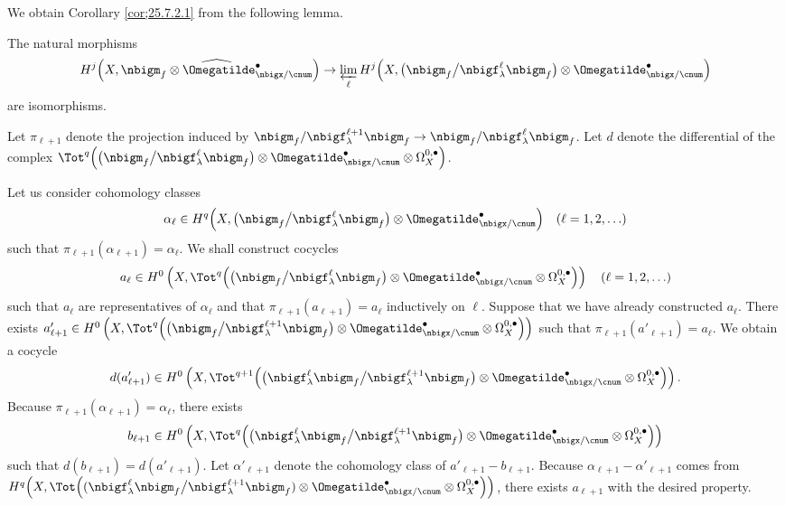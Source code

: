 \documentclass[a4,10pt]{article}
\begin{document}
\vspace{.1in}
We obtain Corollary \ref{cor;25.7.2.1}
from the following lemma.
\begin{lem}
The natural morphisms
\[
 H^j\Bigl(X, \widehat{
 \nbigm_f\otimes\Omegatilde^{\bullet}_{\nbigx/\cnum}}
  \Bigr)
 \to
  \varprojlim_{\ell}
 H^j\Bigl(
 X,
\bigl(
 \nbigm_f\big/
 \nbigf^{\ell}_{\lambda}\nbigm_f
 \bigr)
 \otimes\Omegatilde^{\bullet}_{\nbigx/\cnum}
 \Bigr)
\]
are isomorphisms.
\end{lem}
\pf
Let $\pi_{\ell+1}$ denote the projection
induced by
$\nbigm_f/\nbigf_{\lambda}^{\ell+1}\nbigm_f
\to
\nbigm_f/\nbigf_{\lambda}^{\ell}\nbigm_f$.
Let $d$ denote the differential of the complex
$\Tot^q\Bigl(
\bigl(
\nbigm_f
\big/
\nbigf^{\ell}_{\lambda}\nbigm_f
\bigr)
\otimes\Omegatilde^{\bullet}_{\nbigx/\cnum}
\otimes\Omega^{0,\bullet}_X
\Bigr)$.

Let us consider cohomology classes
\[
\alpha_{\ell}\in
 H^q\Bigl(
 X,
\bigl(
\nbigm_f\big/
\nbigf^{\ell}_{\lambda}\nbigm_f
\bigr)
\otimes\Omegatilde^{\bullet}_{\nbigx/\cnum}
\Bigr)
\quad
(\ell=1,2,\ldots)
\]
such that 
$\pi_{\ell+1}(\alpha_{\ell+1})=\alpha_{\ell}$.
We shall construct cocycles
\[
a_{\ell}
\in 
  H^0\left(
  X,
\Tot^q\Bigl(
\bigl(
\nbigm_f
\big/
\nbigf^{\ell}_{\lambda}\nbigm_f
\bigr)
\otimes\Omegatilde^{\bullet}_{\nbigx/\cnum}
\otimes\Omega^{0,\bullet}_X
\Bigr)
\right)
\quad
(\ell=1,2,\ldots)
\]
such that
$a_{\ell}$ are representatives of $\alpha_{\ell}$
and that $\pi_{\ell+1}(a_{\ell+1})=a_{\ell}$
inductively on $\ell$.
Suppose that we have already constructed $a_{\ell}$.
There exists 
$a'_{\ell+1}
 \in
  H^0\left(
  X,
\Tot^q\Bigl(
\bigl(
\nbigm_f\big/
\nbigf^{\ell+1}_{\lambda}\nbigm_f
\bigr)
\otimes\Omegatilde^{\bullet}_{\nbigx/\cnum}
\otimes\Omega^{0,\bullet}_X
\Bigr)
\right)$
such that
$\pi_{\ell+1}(a'_{\ell+1})=a_{\ell}$.
We obtain a cocycle
\[
 d(a'_{\ell+1})
\in
H^0\left(
X,
\Tot^{q+1}\Bigl(
\bigl(
\nbigf^{\ell}_{\lambda}\nbigm_f
\big/
\nbigf^{\ell+1}_{\lambda}\nbigm_f
\bigr)
\otimes\Omegatilde^{\bullet}_{\nbigx/\cnum}
\otimes\Omega^{0,\bullet}_X
\Bigr)
\right).
\]
Because $\pi_{\ell+1}(\alpha_{\ell+1})=\alpha_{\ell}$,
there exists
\[
 b_{\ell+1}\in
  H^0\left(
  X,
\Tot^q\Bigl(
\bigl(
\nbigf^{\ell}_{\lambda}\nbigm_f
\big/
\nbigf^{\ell+1}_{\lambda}\nbigm_f
\bigr)
\otimes\Omegatilde^{\bullet}_{\nbigx/\cnum}
\otimes\Omega^{0,\bullet}_X
\Bigr)
\right)
\]
such that
$d(b_{\ell+1})=d(a'_{\ell+1})$.
Let $\alpha'_{\ell+1}$
denote the cohomology class of $a'_{\ell+1}-b_{\ell+1}$.
Because
$\alpha_{\ell+1}-\alpha'_{\ell+1}$
comes from
$H^q\Bigl(
 X,\Tot\Bigl(
 (\nbigf_{\lambda}^{\ell}\nbigm_f
 \big/
 \nbigf_{\lambda}^{\ell+1}\nbigm_f)
 \otimes\Omegatilde_{\nbigx/\cnum}^{\bullet}\otimes\Omega_X^{0,\bullet}
 \Bigr)
 \Bigr)$,
there exists $a_{\ell+1}$
with the desired property.
\end{document}
